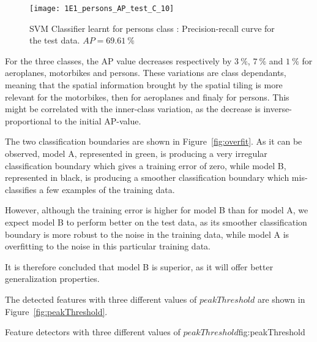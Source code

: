 \documentclass{article}
\begin{document}
\begin{figure}[ht!]
	\centering
	\texttt{[image: 1E1\_persons\_AP\_test\_C\_10]}
	\caption{SVM Classifier learnt for persons class : Precision-recall curve for the test data. \(AP = 69.61~\%\)}
	\label{fig_1E1_persons}
\end{figure}

For the three classes, the AP value decreases respectively by \(3~\%\),  \(7~\%\) and \(1~\%\) for aeroplanes, motorbikes and persons. These variations are class dependants, meaning that the spatial information brought by the spatial tiling is more relevant for the motorbikes, then for aeroplanes and finaly for persons. This might be correlated with the inner-class variation, as the decrease is inverse-proportional to the initial AP-value.

\clearpage



\clearpage

The two classification boundaries are shown in Figure~\ref{fig:overfit}. As it can be observed, model A, represented in green, is producing a very irregular classification boundary which gives a training error of zero, while model B, represented in black, is producing a smoother classification boundary which mis-classifies a few examples of the training data.

However, although the training error is higher for model B than for model A, we expect model B to perform better on the test data, as its smoother classification boundary is more robust to the noise in the training data, while model A is overfitting to the noise in this particular training data.

It is therefore concluded that model B is superior, as it will offer better generalization properties.



The detected features with three different values of $peakThreshold$ are shown in Figure~\ref{fig:peakThreshold}. %

{}
{}
{Feature detectors with three different values of $peakThreshold$}{fig:peakThreshold}
\end{document}
